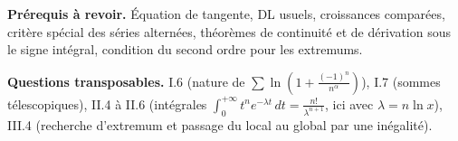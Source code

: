 \documentclass[11pt,a4paper]{article}
\begin{document}
\textbf{Prérequis à revoir.} Équation de tangente, DL usuels, croissances comparées, critère spécial des séries alternées, théorèmes de continuité et de dérivation sous le signe intégral, condition du second ordre pour les extremums.

\textbf{Questions transposables.} I.6 (nature de \(\sum\ln(1+\frac{(-1)^n}{n^\alpha})\)), I.7 (sommes télescopiques), II.4 à II.6 (intégrales \(\int_0^{+\infty}t^ne^{-\lambda t}\,dt=\frac{n!}{\lambda^{n+1}}\), ici avec \(\lambda=n\ln x\)), III.4 (recherche d'extremum et passage du local au global par une inégalité).
\end{document}
